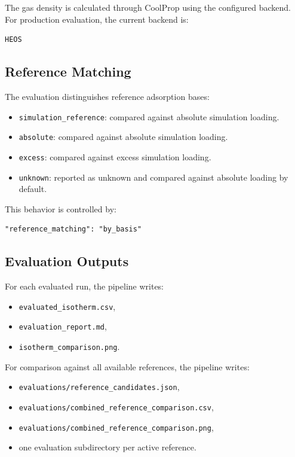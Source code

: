 \documentclass[11pt,a4paper]{article}
\begin{document}
The gas density is calculated through CoolProp using the configured backend.
For production evaluation, the current backend is:

\begin{lstlisting}
HEOS
\end{lstlisting}

\subsection{Reference Matching}

The evaluation distinguishes reference adsorption bases:

\begin{itemize}
    \item \texttt{simulation\_reference}: compared against absolute simulation loading.
    \item \texttt{absolute}: compared against absolute simulation loading.
    \item \texttt{excess}: compared against excess simulation loading.
    \item \texttt{unknown}: reported as unknown and compared against absolute loading by default.
\end{itemize}

This behavior is controlled by:

\begin{lstlisting}
"reference_matching": "by_basis"
\end{lstlisting}

\subsection{Evaluation Outputs}

For each evaluated run, the pipeline writes:

\begin{itemize}
    \item \texttt{evaluated\_isotherm.csv},
    \item \texttt{evaluation\_report.md},
    \item \texttt{isotherm\_comparison.png}.
\end{itemize}

For comparison against all available references, the pipeline writes:

\begin{itemize}
    \item \texttt{evaluations/reference\_candidates.json},
    \item \texttt{evaluations/combined\_reference\_comparison.csv},
    \item \texttt{evaluations/combined\_reference\_comparison.png},
    \item one evaluation subdirectory per active reference.
\end{itemize}
\end{document}
